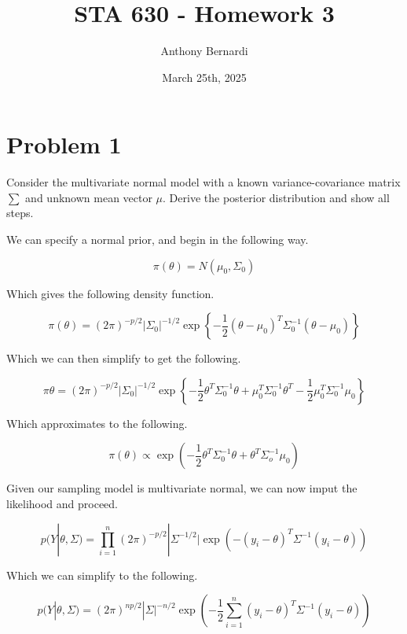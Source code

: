 \documentclass[12pt, letterpaper]{article}
\title{STA 630 - Homework 3}
\author{Anthony Bernardi}
\date{March 25th, 2025}
\begin{document}
\maketitle

\section{Problem 1}

Consider the multivariate normal model with a known variance-covariance matrix $\sum$ and unknown mean vector $\mu$.  Derive the posterior distribution and show all steps. 

We can specify a normal prior, and begin in the following way. 

\begin{equation}
  \pi(\theta) = N(\mu_0, \Sigma_0) 
\end{equation} 

Which gives the following density function. 

\begin{equation}
  \pi(\theta) = (2\pi)^{-p/2} |\Sigma_0|^{-1/2} \exp\left\{ -\frac{1}{2} (\theta - \mu_0)^T \Sigma_0^{-1} (\theta - \mu_0) \right\}
\end{equation} 

Which we can then simplify to get the following. 

\begin{equation}
  \pi{\theta} = (2\pi)^{-p/2} |\Sigma_0|^{-1/2} \exp\left\{ -\frac{1}{2} \theta^T \Sigma_0^{-1} \theta + \mu_0^T \Sigma_0^{-1}\theta^T - \frac{1}{2} \mu_0^T \Sigma_0^{-1} \mu_0 \right\}
\end{equation} 

Which approximates to the following. 

\begin{equation}
  \pi(\theta) \propto \exp\left( -\frac{1}{2} \theta^T \Sigma_0^{-1} \theta + \theta^T \Sigma_o^{-1} \mu_0 \right)
\end{equation} 

Given our sampling model is multivariate normal, we can now imput the likelihood and proceed. 

\begin{equation}
  p(Y | \theta, \Sigma) = \prod_{i=1}^n (2\pi)^{-p/2} |\Sigma^{-1/2}| \exp( -(y_i - \theta)^T \Sigma^{-1} (y_i - \theta))
\end{equation} 

Which we can simplify to the following. 

\begin{equation}
  p(Y | \theta, \Sigma) = (2\pi)^{np/2} |\Sigma|^{-n/2} \exp(-\frac{1}{2} \sum_{i=1}^n (y_i - \theta)^T \Sigma^{-1} (y_i - \theta)) 
\end{equation} 
\end{document}
